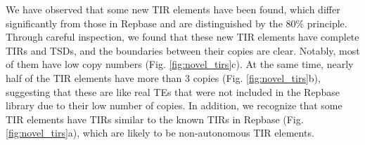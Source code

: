 \documentclass{bmcart}
\begin{document}



We have observed that some new TIR elements have been found, which differ significantly from those in Repbase and are distinguished by the 80\% principle\cite{wicker2007unified}. Through careful inspection, we found that these new TIR elements have complete TIRs and TSDs, and the boundaries between their copies are clear. Notably, most of them have low copy numbers (Fig. \ref{fig:novel_tirs}c). At the same time, nearly half of the TIR elements have more than 3 copies (Fig. \ref{fig:novel_tirs}b), suggesting that these are like real TEs that were not included in the Repbase library due to their low number of copies.
In addition, we recognize that some TIR elements have TIRs similar to the known TIRs in Repbase (Fig. \ref{fig:novel_tirs}a), which are likely to be non-autonomous TIR elements.
\end{document}
